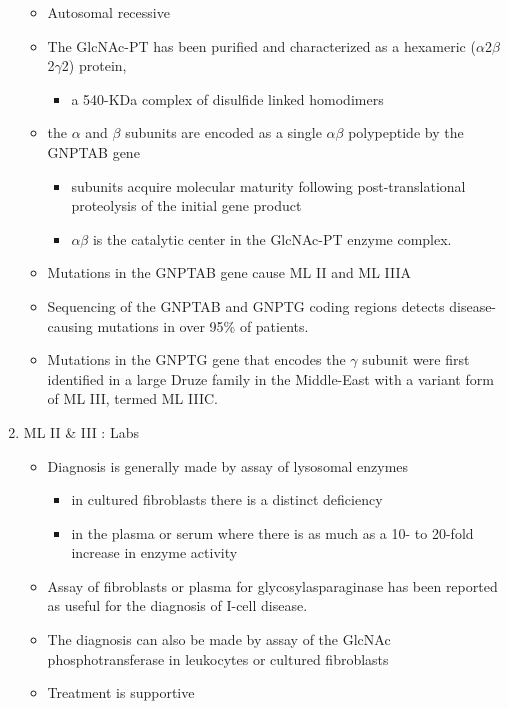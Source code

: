 \documentclass{scrartcl}
\begin{document}
\begin{enumerate}
\begin{itemize}
\item Autosomal recessive
\item The GlcNAc-PT has been purified and characterized as a hexameric
(\(\alpha\)2\(\beta\)2\(\gamma\)2) protein,
\begin{itemize}
\item a 540-KDa complex of disulfide linked homodimers
\end{itemize}
\item the \(\alpha\) and \(\beta\) subunits are encoded as a single \(\alpha \beta\) polypeptide by the GNPTAB gene
\begin{itemize}
\item subunits acquire molecular maturity following post-translational proteolysis of the initial gene product
\item \(\alpha \beta\) is the catalytic center in the GlcNAc-PT enzyme complex.
\end{itemize}
\item Mutations in the GNPTAB gene cause ML II and ML IIIA
\item Sequencing of the GNPTAB and GNPTG coding regions detects
disease-causing mutations in over 95\% of patients.
\item Mutations in the GNPTG gene that encodes the \(\gamma\) subunit were
first identified in a large Druze family in the Middle-East with a
variant form of ML III, termed ML IIIC.
\end{itemize}


\item ML II \& III : Labs
\label{sec:org8b6311f}

\begin{itemize}
\item Diagnosis is generally made by assay of lysosomal enzymes
\begin{itemize}
\item in cultured fibroblasts there is a distinct deficiency
\item in the plasma or serum where there is as much as a 10- to 20-fold increase in enzyme activity
\end{itemize}
\item Assay of fibroblasts or plasma for glycosylasparaginase has been
reported as useful for the diagnosis of I-cell disease.
\item The diagnosis can also be made by assay of the GlcNAc
phosphotransferase in leukocytes or cultured fibroblasts
\end{itemize}


\begin{itemize}
\item Treatment is supportive
\end{itemize}
\end{enumerate}
\end{document}
